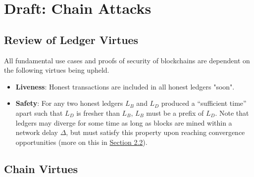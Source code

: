 \chapter{Draft: Chain Attacks}

\section{Review of Ledger Virtues}
All fundamental use cases and proofs of security of blockchains are dependent on the following virtues being upheld.

\begin{itemize}
    \label{sec:liveness}
    \item \textbf{Liveness}: Honest transactions are included in all honest ledgers "soon".
    \label{sec:saftey}
    \item \textbf{Safety}: For any two honest ledgers $L_B$ and $L_D$ produced a ``sufficient time'' apart such that $L_D$ is fresher than $L_B$, $L_B$ must be a prefix of $L_D$. Note that ledgers may diverge for some time as long as blocks are mined within a network delay $\Delta$, but must satisfy this property upon reaching convergence opportunities (more on this in \hyperref[sec:mechanics]{Section 2.2}).
\end{itemize}

\section{Chain Virtues}

